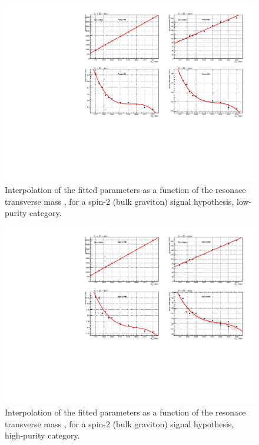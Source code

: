 \begin{figure}[!htb]
  \centering
    \includegraphics[width=.95\textwidth]{plotsAlpha_tesi/XVZnnlp/XZZInv_SignalShape.pdf}
  \caption{Interpolation of the fitted parameters as a function of the resonace transverse mass \mtVZ, for a spin-2 (bulk graviton) signal hypothesis, low-purity category.}
  \label{fig:XZZ_SignalShapeLP}
\end{figure}

\begin{figure}[!htb]
  \centering
    \includegraphics[width=.95\textwidth]{plotsAlpha_tesi/XVZnnhp/XZZInv_SignalShape.pdf}

  \caption{Interpolation of the fitted parameters as a function of the resonace transverse mass \mtVZ, for a spin-2 (bulk graviton) signal hypothesis, high-purity category.}
  \label{fig:XZZ_SignalShapeHP}
\end{figure}

